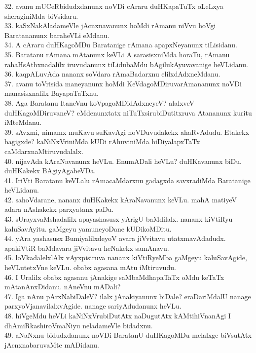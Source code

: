 \documentclass{article}
\begin{document}
32. avanu mUCeRbidudxdanunx noVDi cAraru duHKapaTuTx oLeLxya sheraginiMda biVsidaru.\\
33. kaSxNakAladameVle jAcnxnavanunx hoMdi rAmanu niVvu hoVgi Baratananunx baraheVLi eMdanu.\\
34. A cAraru duHKagoMDu Baratanige rAmana apapxNeyanunx tiLisidanu.\\
35. Baratanu rAmana mAtanunx keVLi A sarasisxniMda horaTu, rAmanu rahaHsAthxnadalilx iruvudanunx tiLidubaMdu bAgilukAyuvavanige heVLidanu.\\
36. kaqpALuvAda nananx soVdara rAmaBadarxnu elilxdAdxneMdanu.\\
37. avanu toVrisida maneyanunx hoMdi KeVdagoMDiruvarAmananunx noVDi manasisxnalilx BayapaTaTxnu.\\
38. Aga Baratanu ItaneVnu koVpagoMDidAdxneyeV? alalxveV duHKagoMDiruvaneV? eMdenunxtatx niTuTxsirubiDutitxruva Atananunx kuritu iMteMdanu.\\
39. sAvxmi, nimamx muKavu suKavAgi noVDuvudakekx ahaRvAdudu. Etakekx bagigxde? kaNiNxVriniMda kUDi rAhuviniMda hiDiyalapxTaTx caMdarxnaMtiruvudalalx.\\
40. nijavAda kAraNavanunx heVLu. EnumADali heVLu? duHKavanunx biDu. duHKakekx BAgiyAgabeVDa.\\
41. IriVti Baratanu keVLalu rAmacaMdarxnu gadagxda savxradiMda Baratanige heVLidanu.\\
42. sahoVdarane, nananx duHKakekx kAraNavanunx keVLu. mahA matiyeV adara nAshakekx parxyatanx paDu.\\
43. sUrayxvaMshadalilx apayashasusx yArigU baMdilalx. nananx kiVtiRyu kaluSavAyitu. gaMgeyu yamuneyoDane kUDikoMDitu.\\
44. yAra yashasusx BumiyalilxdeyoV avara jiVvitavu utatxmavAdadudx. apakiVtiR baMdavara jiVvitavu heNakekx samAnavu.\\
45. loVkadalelxlAlx vAyxpisiruva nananx kiVtiRyeMba gaMgeyu kaluSavAgide, heVLutetxVne keVLu. obabx agasana mAtu iMtiruvudu.\\
46. I Uralilx obabx agasanu jAnakige saMbaMdhapaTaTx oMdu keTaTx mAtanAnxDidanu. nAneVnu mADali?\\
47. Iga nAnu pArxNabiDaleV? ilalx jAnakiyanunx biDale? eraDariMdalU nanage parxyoVjanavilalxvAgide. nanage sariyAdudanunx heVLu.\\
48. hiVgeMdu heVLi kaNiNxVrubiDutAtx naDugutAtx kAMtihiVnanAgi I dhAmiRkashiroVmaNiyu neladameVle bidadxnu.\\
49. aNaNxnu bidudxdanunx noVDi BaratanU duHKagoMDu melalxge biVsutAtx jAcnxnabaruvaMte mADidanu.\\
\end{document}
